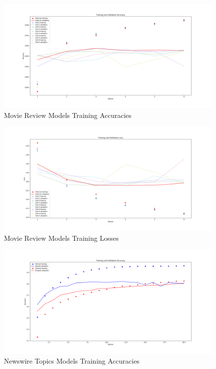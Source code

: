 \documentclass[sigconf, nonacm]{acmart}
\begin{document}



\appendix

\begin{figure}[h]
  \centering
  \includegraphics[width=\linewidth]{classifyMovieReviews_Accuracy}
  \caption{Movie Review Models Training Accuracies}
  \label{fig:MovieAcc}
\end{figure}

\begin{figure}[h]
  \centering
  \includegraphics[width=\linewidth]{classifyMovieReviews_Loss}
  \caption{Movie Review Models Training Losses}
  \label{fig:MovieLoss}
\end{figure}

\begin{figure}[h]
  \centering
  \includegraphics[width=\linewidth]{classifyNewswireTopics_Accuracy}
  \caption{Newswire Topics Models Training Accuracies}
  \label{fig:NewswireAcc}
\end{figure}
\end{document}
